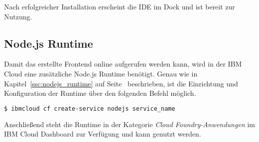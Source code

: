 Nach erfolgreicher Installation erscheint die IDE im Dock und ist bereit zur Nutzung.

\subsection{Node.js Runtime}
Damit das erstellte Frontend online aufgerufen werden kann, wird in der IBM Cloud eine zusätzliche Node.js Runtime
benötigt. Genau wie in Kapitel~\ref{ssc:nodejs_runtime} auf Seite~\pageref{ssc:nodejs_runtime} beschrieben, ist die
Einrichtung und Konfiguration der Runtime über den folgenden Befehl möglich.

\begin{lstlisting}[language=bash, caption=Instanziierung der Node.js Runtime, label=ls:vorbereitung_nodejsdashboard]
    $ ibmcloud cf create-service nodejs service_name
\end{lstlisting}

Anschließend steht die Runtime in der Kategorie \textit{Cloud Foundry-Anwendungen} im IBM Cloud Dashboard zur Verfügung
und kann genutzt werden.